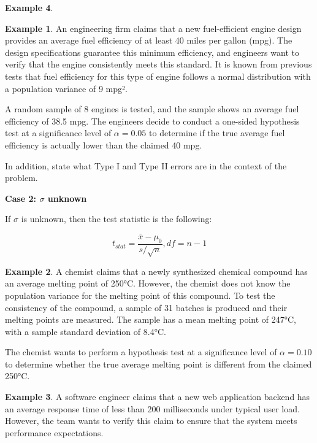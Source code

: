 \documentclass[
  11pt,
  oneside]{book}
\theoremstyle{definition}
\theoremstyle{definition}
\newtheorem{example}{Example}[chapter]
\theoremstyle{definition}
\theoremstyle{definition}
\theoremstyle{remark}
\begin{document}
\begin{example}
\newpage

\begin{example}
An engineering firm claims that a new fuel-efficient engine design provides an average fuel efficiency of at least 40 miles per gallon (mpg). The design specifications guarantee this minimum efficiency, and engineers want to verify that the engine consistently meets this standard. It is known from previous tests that fuel efficiency for this type of engine follows a normal distribution with a population variance of 9 mpg².

A random sample of 8 engines is tested, and the sample shows an average fuel efficiency of 38.5 mpg. The engineers decide to conduct a one-sided hypothesis test at a significance level of \(\alpha = 0.05\) to determine if the true average fuel efficiency is actually lower than the claimed 40 mpg.

In addition, state what Type I and Type II errors are in the context of the problem.
\end{example}

\vfill

\newpage

\textbf{Case 2: \(\sigma\) unknown}

If \(\sigma\) is unknown, then the test statistic is the following:

\[t_{stat} = \frac{\bar{x}-\mu_0}{s/\sqrt{n}}, df=n-1\]

\begin{example}
A chemist claims that a newly synthesized chemical compound has an average melting point of 250°C. However, the chemist does not know the population variance for the melting point of this compound. To test the consistency of the compound, a sample of 31 batches is produced and their melting points are measured. The sample has a mean melting point of 247°C, with a sample standard deviation of 8.4°C.

The chemist wants to perform a hypothesis test at a significance level of \(\alpha = 0.10\) to determine whether the true average melting point is different from the claimed 250°C.
\end{example}

\newpage

\begin{example}
A software engineer claims that a new web application backend has an average response time of less than 200 milliseconds under typical user load. However, the team wants to verify this claim to ensure that the system meets performance expectations.


\end{example}
\end{example}
\end{document}
